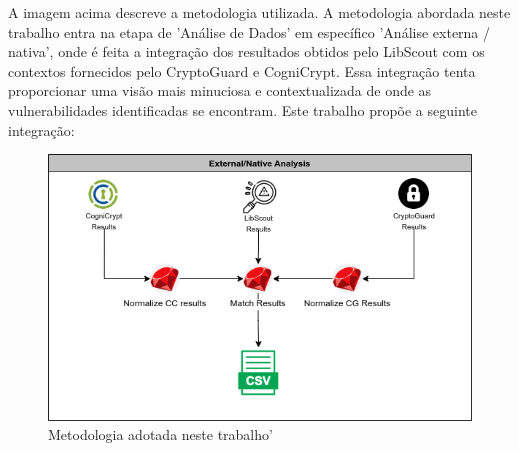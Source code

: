 A imagem acima descreve a metodologia utilizada. \cite{perception_developers} A metodologia abordada neste trabalho entra na etapa de 'Análise de Dados' em específico 'Análise externa / nativa', onde é feita a integração dos resultados obtidos pelo LibScout com os contextos fornecidos pelo CryptoGuard e CogniCrypt. Essa integração tenta proporcionar uma visão mais minuciosa e contextualizada de onde as vulnerabilidades identificadas se encontram.
Este trabalho propõe a seguinte integração:

\begin{figure}[!ht]
  \centering
  \includegraphics[scale=0.5]{img/studySettingsExternal.png}
  \caption{Metodologia adotada neste trabalho'}
  \label{averageWarnings}
\end{figure}

